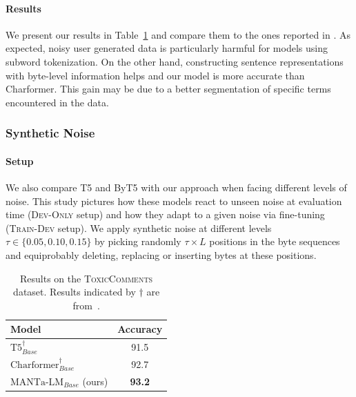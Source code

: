 \paragraph{Results} We present our results in Table~\ref{tab:toxic} and compare them to the ones reported in \citet{tay2021charformer}. As expected, noisy user generated data is particularly harmful for models using subword tokenization. On the other hand, constructing sentence representations with byte-level information  helps and our model is more accurate than Charformer. This gain may be due to a better segmentation of specific terms encountered in the data.


\subsubsection{Synthetic Noise}
\paragraph{Setup} We also compare T5 and ByT5 with our approach when facing different levels of noise. This study pictures how these models react to unseen noise at evaluation time (\textsc{Dev-Only} setup) and how they adapt to a given noise via fine-tuning (\textsc{Train-Dev} setup). We apply synthetic noise at different levels $\tau\in\{0.05, 0.10, 0.15\}$ by picking randomly $\tau \times L$ positions in the byte sequences and equiprobably deleting, replacing or inserting bytes at these positions.


\begin{table}[t]
\centering\small
\begin{tabular}{lc}
\toprule
Model                                   & Accuracy      \\ \midrule
$\text{T5}_{Base}^\dagger$              & 91.5          \\
$\text{Charformer}_{Base}^\dagger$      & 92.7          \\
$\text{MANTa-LM}_{Base}$ (ours)      & {\textbf{93.2}}   \\\bottomrule
\end{tabular}
\caption{Results on the \textsc{ToxicComments} dataset. Results indicated by $\dagger$ are from~\citet{tay2021charformer}.}
\label{tab:toxic}
\end{table}

